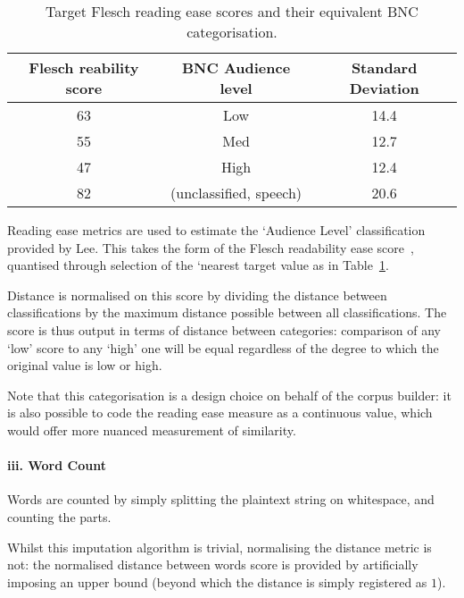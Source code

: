 \begin{table}[h]
    \center
    \begin{tabular}{|c|c|c|}
        \hline 
        Flesch reability score & BNC Audience level & Standard Deviation \\
        \hline 
        63 & Low & 14.4\\
        55 & Med & 12.7 \\
        47 & High & 12.4\\
        82 & (unclassified, speech) & 20.6 \\
        \hline
    \end{tabular}
    \caption{Target Flesch reading ease scores and their equivalent BNC categorisation.}
    \label{tab:rebuilding:method:fscore}
\end{table}


Reading ease metrics are used to estimate the `Audience Level' classification provided by Lee.  This takes the form of the Flesch readability ease score~\cite{flesch1948new}, quantised through selection of the `nearest target value as in Table~\ref{tab:rebuilding:method:fscore}.

Distance is normalised on this score by dividing the distance between classifications by the maximum distance possible between all classifications.  The score is thus output in terms of distance between categories: comparison of any `low' score to any `high' one will be equal regardless of the degree to which the original value is low or high.

Note that this categorisation is a design choice on behalf of the corpus builder: it is also possible to code the reading ease measure as a continuous value, which would offer more nuanced measurement of similarity.


\paragraph{iii. Word Count}
Words are counted by simply splitting the plaintext string on whitespace, and counting the parts.

Whilst this imputation algorithm is trivial, normalising the distance metric is not: the normalised distance between words score is provided by artificially imposing an upper bound (beyond which the distance is simply registered as $1$).




